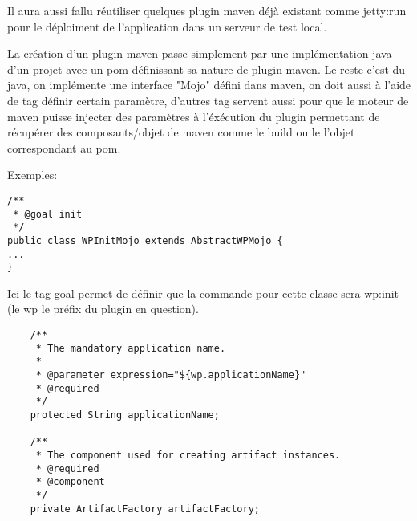 Il aura aussi fallu réutiliser quelques plugin maven déjà existant comme jetty:run
pour le déploiment de l'application dans un serveur de test local. 

La création d'un plugin maven passe simplement par une implémentation java d'un
projet avec un pom définissant sa nature de plugin maven. Le reste c'est du java,
on implémente une interface "Mojo" défini dans maven, on doit aussi à l'aide de 
tag définir certain paramètre, d'autres tag servent aussi pour que le moteur
de maven puisse injecter des paramètres à l'éxécution du plugin permettant de
récupérer des composants/objet de maven comme le build ou le l'objet correspondant
au pom.


Exemples:

\begin{lstlisting}
/**
 * @goal init
 */
public class WPInitMojo extends AbstractWPMojo {
...
}
\end{lstlisting}

Ici le tag goal permet de définir que la commande pour cette classe sera wp:init
(le wp le préfix du plugin en question). 

\begin{lstlisting}
    /**
     * The mandatory application name.
     *
     * @parameter expression="${wp.applicationName}"
     * @required
     */
    protected String applicationName;

    /**
     * The component used for creating artifact instances.
     * @required
     * @component
     */
    private ArtifactFactory artifactFactory;

\end{lstlisting}

